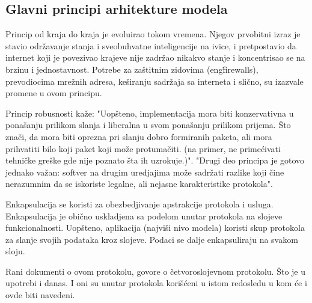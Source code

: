 \documentclass[a4paper,12pt, master]{etf}
\begin{document}
	\subsection{Glavni principi arhitekture modela}

	Princip od kraja do kraja je evoluirao tokom vremena. Njegov prvobitni
	izraz je stavio	odr\v{z}avanje stanja i sveobuhvatne inteligencije na ivice,
	 i pretpostavio da internet koji je	povezivao krajeve nije zadr\v{z}ao
	nikakvo stanje i koncentrisao se na brzinu i jednostavnost. Potrebe za
	za\v{s}titnim zidovima (eng\. firewalls), prevodiocima mre\v{z}nih adresa,
    ke\v{s}iranju sadr\v{z}aja sa interneta i sli\v{c}no, su izazvale promene u
    ovom principu.

	Princip robusnosti ka\v{z}e: "Uop\v{s}teno, implementacija mora biti
	konzervativna u pona\v{s}anju prilikom slanja i liberalna u svom
	pona\v{s}anju prilikom prijema. \v{S}to zna\v{c}i, da mora biti
	oprezna pri slanju dobro formiranih paketa, ali mora prihvatiti bilo koji
    paket koji mo\v{z}e protuma\v{c}iti. (na primer, ne prime\'{c}ivati
    tehni\v{c}ke gre\v{s}ke gde nije poznato \v{s}ta ih uzrokuje.)". "Drugi deo
    principa je gotovo jednako va\v{z}an: softver na drugim uredjajima mo\v{z}e
    sadr\v{z}ati razlike koji \v{c}ine nerazumnim da se iskoriste legalne, ali
    nejasne karakteristike protokola".

	Enkapsulacija se koristi za obezbedjivanje apstrakcije protokola i usluga.
	Enkapsulacija je obi\v{c}no uskladjena sa podelom unutar protokola na
	slojeve funkcionalnosti. Uop\v{s}teno, aplikacija (najvi\v{s}i nivo modela)
	koristi skup protokola za slanje svojih podataka kroz slojeve. Podaci se
	dalje enkapsuliraju na svakom sloju.

	Rani dokumenti o ovom protokolu, govore o \v{c}etvoroslojevnom protokolu.
	\v{S}to je u upotrebi i	danas. I oni su unutar protokola kori\v{s}\'{c}eni
	u istom redosledu u kom \'{c}e i ovde biti navedeni.
\end{document}
